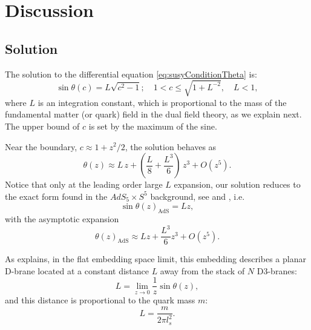 \section{Discussion}\label{sec:discussion}

\subsection{Solution}\label{sec:solution}

The solution to the differential equation \eqref{eq:susyConditionTheta} is:
\begin{equation}\label{eq:susyConditionSolution}
\boxed{\sin\theta(c) = L \sqrt{c^2-1}; \quad 1 < c \leq \sqrt{1+L^{-2}}, \quad L < 1},
\end{equation}
where $L$ is an integration constant, which is proportional to the mass of the fundamental matter (or quark) field in the dual field theory, as we explain next. The upper bound of $c$ is set by the maximum of the sine.

Near the boundary, $c \approx 1 + z^2/2$, the solution behaves as
\begin{equation} \label{eq:thetaExpanded}
 \theta(z) \approx L \, z + \left(\frac{L}{8} +\frac{L^3}{6} \right) \, z^3 + O(z^5).
\end{equation} 
Notice that only at the leading order large $L$ expansion, our solution reduces to the exact form found in the $AdS_5 \times S^5$ background, see \cite{Karch:2002sh} and \cite{Karch:2005ms}, i.e.
\begin{equation}
 \sin\theta(z)_\text{AdS} = L z,
\end{equation}
with the asymptotic expansion
\begin{equation}
\theta(z)_\text{AdS} \approx L z + \frac{L^3}{6} z^3 + O(z^5).
\end{equation}

As \cite{Karch:2005ms} explains, in the flat embedding space limit, this embedding describes a planar D-brane located at a constant distance $L$ away from the stack of $N$ D3-branes:
\begin{equation}
 L = \lim_{z \rightarrow 0 } \frac{1}{z} \sin\theta(z),
\end{equation}
and this distance is proportional to the quark mass $m$:
\begin{equation}
 L = \dfrac{m}{2 \pi l_s^2}.
\end{equation}


